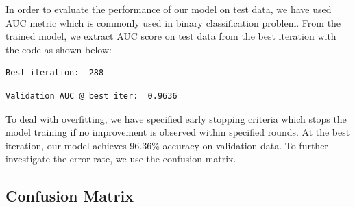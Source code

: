 \documentclass[11pt,oneside,a4paper]{reedthesis}
\newenvironment{Shaded}{\begin{snugshade}}{\end{snugshade}}
\newcommand{\KeywordTok}[1]{\textcolor[rgb]{0.13,0.29,0.53}{\textbf{#1}}}
\newcommand{\CharTok}[1]{\textcolor[rgb]{0.31,0.60,0.02}{#1}}
\newcommand{\StringTok}[1]{\textcolor[rgb]{0.31,0.60,0.02}{#1}}
\newcommand{\OperatorTok}[1]{\textcolor[rgb]{0.81,0.36,0.00}{\textbf{#1}}}
\newcommand{\NormalTok}[1]{#1}
\begin{document}
In order to evaluate the performance of our model on test data, we have
used AUC metric which is commonly used in binary classification problem.
From the trained model, we extract AUC score on test data from the best
iteration with the code as shown below:
\begin{Shaded}
\end{Shaded}
\begin{verbatim}
Best iteration:  288 
\end{verbatim}
\begin{Shaded}
\end{Shaded}
\begin{verbatim}
Validation AUC @ best iter:  0.9636 
\end{verbatim}
To deal with overfitting, we have specified early stopping criteria
which stops the model training if no improvement is observed within
specified rounds. At the best iteration, our model achieves 96.36\%
accuracy on validation data. To further investigate the error rate, we
use the confusion matrix.

\subsection{Confusion Matrix}\label{confusion-matrix}
\end{document}
